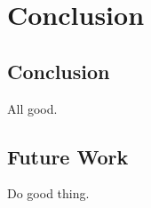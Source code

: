 \chapter{Conclusion}

\label{Chapter6}

\section{Conclusion}

All good.

\section{Future Work}

Do good thing.